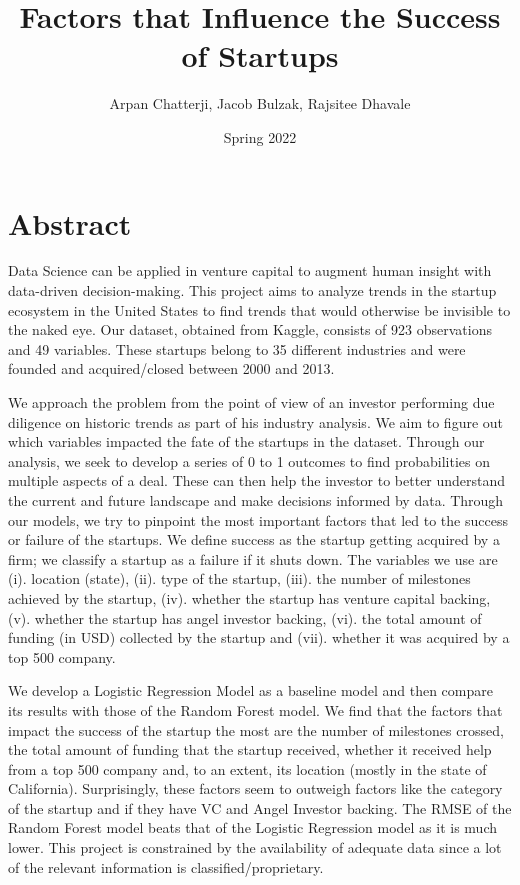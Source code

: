 \documentclass[
]{article}
\title{Factors that Influence the Success of Startups}
\author{Arpan Chatterji, Jacob Bulzak, Rajsitee Dhavale}
\date{Spring 2022}
\begin{document}
\maketitle

\hypertarget{abstract}{%
\section{Abstract}\label{abstract}}

Data Science can be applied in venture capital to augment human insight
with data-driven decision-making. This project aims to analyze trends in
the startup ecosystem in the United States to find trends that would
otherwise be invisible to the naked eye. Our dataset, obtained from
Kaggle, consists of 923 observations and 49 variables. These startups
belong to 35 different industries and were founded and acquired/closed
between 2000 and 2013.

We approach the problem from the point of view of an investor performing
due diligence on historic trends as part of his industry analysis. We
aim to figure out which variables impacted the fate of the startups in
the dataset. Through our analysis, we seek to develop a series of 0 to 1
outcomes to find probabilities on multiple aspects of a deal. These can
then help the investor to better understand the current and future
landscape and make decisions informed by data. Through our models, we
try to pinpoint the most important factors that led to the success or
failure of the startups. We define success as the startup getting
acquired by a firm; we classify a startup as a failure if it shuts down.
The variables we use are (i). location (state), (ii). type of the
startup, (iii). the number of milestones achieved by the startup, (iv).
whether the startup has venture capital backing, (v). whether the
startup has angel investor backing, (vi). the total amount of funding
(in USD) collected by the startup and (vii). whether it was acquired by
a top 500 company.

We develop a Logistic Regression Model as a baseline model and then
compare its results with those of the Random Forest model. We find that
the factors that impact the success of the startup the most are the
number of milestones crossed, the total amount of funding that the
startup received, whether it received help from a top 500 company and,
to an extent, its location (mostly in the state of California).
Surprisingly, these factors seem to outweigh factors like the category
of the startup and if they have VC and Angel Investor backing. The RMSE
of the Random Forest model beats that of the Logistic Regression model
as it is much lower. This project is constrained by the availability of
adequate data since a lot of the relevant information is
classified/proprietary.
\end{document}
